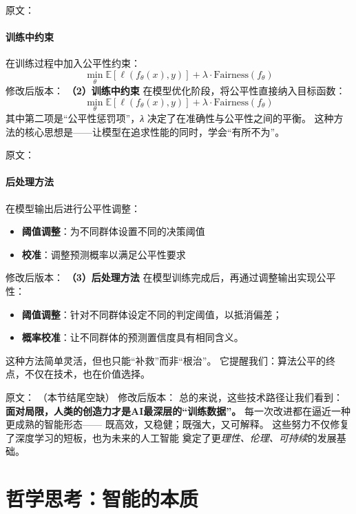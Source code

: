 原文：
\paragraph{训练中约束}
在训练过程中加入公平性约束：
$$\min_\theta \mathbb{E}[\ell(f_\theta(x), y)] + \lambda \cdot \text{Fairness}(f_\theta)$$
修改后版本：
\textbf{（2）训练中约束}  
在模型优化阶段，将公平性直接纳入目标函数：  
$$\min_\theta \mathbb{E}[\ell(f_\theta(x), y)] + \lambda \cdot \text{Fairness}(f_\theta)$$  
其中第二项是“公平性惩罚项”，\textit{λ} 决定了在准确性与公平性之间的平衡。  
这种方法的核心思想是——让模型在追求性能的同时，学会“有所不为”。



原文：
\paragraph{后处理方法}
在模型输出后进行公平性调整：
\begin{itemize}
\item \textbf{阈值调整}：为不同群体设置不同的决策阈值
\item \textbf{校准}：调整预测概率以满足公平性要求
\end{itemize}
修改后版本：
\textbf{（3）后处理方法}  
在模型训练完成后，再通过调整输出实现公平性：  
\begin{itemize}
\item \textbf{阈值调整}：针对不同群体设定不同的判定阈值，以抵消偏差；  
\item \textbf{概率校准}：让不同群体的预测置信度具有相同含义。  
\end{itemize}
这种方法简单灵活，但也只能“补救”而非“根治”。  
它提醒我们：算法公平的终点，不仅在技术，也在价值选择。



原文：
（本节结尾空缺）
修改后版本：
总的来说，这些技术路径让我们看到：  
\textbf{面对局限，人类的创造力才是AI最深层的“训练数据”。}  
每一次改进都在逼近一种更成熟的智能形态——  
既高效，又稳健；既强大，又可解释。  
这些努力不仅修复了深度学习的短板，也为未来的人工智能  
奠定了更\textit{理性、伦理、可持续}的发展基础。

\section{哲学思考：智能的本质}

